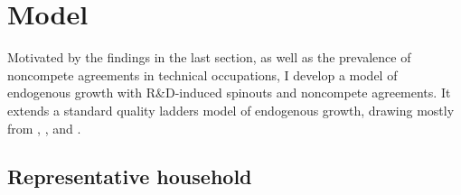 \documentclass[11pt,english]{article}
\theoremstyle{definition}
\begin{document}
\section{Model}\label{sec:model}

Motivated by the findings in the last section, as well as the prevalence of noncompete agreements in technical occupations, I develop a model of endogenous growth with R\&D-induced spinouts and noncompete agreements. It extends a standard quality ladders model of endogenous growth, drawing mostly from \cite{grossman_quality_1991}, \cite{acemoglu_innovation_2015}, and \cite{akcigit_growth_2018}.

\subsection{Representative household}
\end{document}

